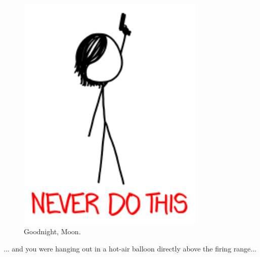 {\begin{figure}[!htbp]
\centering
\includegraphics[scale=0.5, max width=0.8\textwidth]{imgs/a/81/catch_up.png}
\caption{Goodnight, Moon.}
\end{figure}

{... and you were hanging out in a hot-air balloon directly above the firing range...}

}
